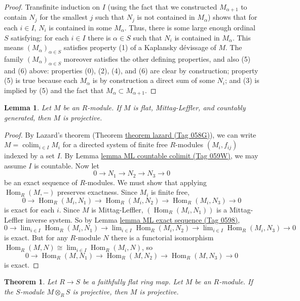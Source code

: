 \documentclass{amsart}
\theoremstyle{plain}
\newtheorem{theorem}[subsection]{Theorem}
\newtheorem{lemma}[subsection]{Lemma}
\theoremstyle{definition}
\theoremstyle{remark}
\numberwithin{equation}{subsection}
\def\lim{\mathop{\mathrm{lim}}\nolimits}
\def\colim{\mathop{\mathrm{colim}}\nolimits}
\def\Hom{\mathop{\mathrm{Hom}}\nolimits}
\begin{document}
\begin{proof}
\medskip\noindent
Transfinite induction on $I$ (using the fact that we constructed
$M_{\alpha + 1}$
to contain $N_j$ for the smallest $j$ such that $N_j$ is not contained in
$M_{\alpha}$) shows that for each $i \in I$, $N_i$ is contained in some
$M_{\alpha}$.  Thus, there is some large enough ordinal $S$ satisfying: for
each $i \in I$ there is $\alpha \in S$ such that $N_i$ is contained in
$M_{\alpha}$.  This means $(M_{\alpha})_{\alpha \in S}$ satisfies property (1)
of a Kaplansky d\'evissage of $M$.  The family $(M_{\alpha})_{\alpha \in S}$
moreover satisfies the other defining properties, and also (5) and (6) above:
properties (0), (2), (4), and (6) are clear by construction;  property (5) is
true because each $M_{\alpha}$ is by construction a direct sum of some $N_i$;
and (3) is implied by (5) and the fact that $M_{\alpha} \subset M_{\alpha + 1}$.
\end{proof}


\begin{lemma}
\label{lemma-countgen-projective}
Let $M$ be an $R$-module.  If $M$ is flat, Mittag-Leffler, and countably
generated, then $M$ is projective.
\end{lemma}

\begin{proof}
By Lazard's theorem (Theorem \href{https://stacks.math.columbia.edu/tag/058G}{theorem lazard (Tag 058G)}), we can write $M =
\colim_{i
\in I} M_i$ for a directed system of finite free $R$-modules $(M_i, f_{ij})$
indexed by a set $I$.  By Lemma \href{https://stacks.math.columbia.edu/tag/059W}{lemma ML countable colimit (Tag 059W)}, we may assume
$I$ is countable.  Now let
$$
0 \to N_1 \to N_2 \to N_3 \to 0
$$
be an exact sequence of $R$-modules.  We must show that applying
$\Hom_R(M, -)$
preserves exactness.  Since $M_i$ is finite free,
$$
0 \to \Hom_R(M_i, N_1) \to \Hom_R(M_i, N_2) \to
\Hom_R(M_i, N_3) \to 0
$$
is exact for each $i$.  Since $M$ is Mittag-Leffler, $(\Hom_R(M_i,
N_{1}))$ is
a Mittag-Leffler inverse system.  So by Lemma \href{https://stacks.math.columbia.edu/tag/0598}{lemma ML exact sequence (Tag 0598)},
$$
0 \to \lim_{i \in I} \Hom_R(M_i, N_1) \to
\lim_{i \in I} \Hom_R(M_i, N_2) \to
\lim_{i \in I} \Hom_R(M_i, N_3) \to 0
$$
is exact.  But for any $R$-module $N$ there is a functorial isomorphism
$\Hom_R(M, N) \cong \lim_{i \in I} \Hom_R(M_i, N)$, so
$$
0 \to \Hom_R(M, N_1) \to \Hom_R(M, N_2) \to
\Hom_R(M, N_3) \to 0
$$
is exact.
\end{proof}


\begin{theorem}
\label{theorem-ffdescent-projectivity}
Let $R \to S$ be a faithfully flat ring map.  Let $M$ be an $R$-module.
 If the $S$-module $M \otimes_R S$ is projective, then $M$ is projective.
\end{theorem}
\end{document}
